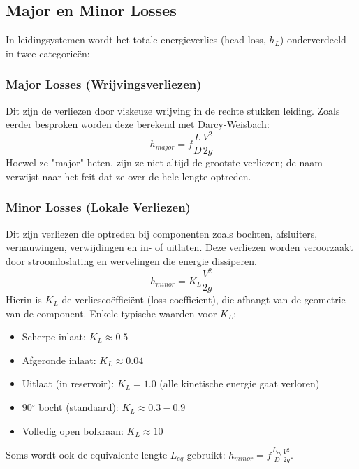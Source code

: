 \documentclass[a4paper,11pt,twoside]{report}
\begin{document}
\subsection{Major en Minor Losses}
In leidingsystemen wordt het totale energieverlies (head loss, $h_L$) onderverdeeld in twee categorieën:

\subsubsection{Major Losses (Wrijvingsverliezen)}
Dit zijn de verliezen door viskeuze wrijving in de rechte stukken leiding. Zoals eerder besproken worden deze berekend met Darcy-Weisbach:
\[ h_{major} = f \frac{L}{D} \frac{V^2}{2g} \]
Hoewel ze "major" heten, zijn ze niet altijd de grootste verliezen; de naam verwijst naar het feit dat ze over de hele lengte optreden.

\subsubsection{Minor Losses (Lokale Verliezen)}
Dit zijn verliezen die optreden bij componenten zoals bochten, afsluiters, vernauwingen, verwijdingen en in- of uitlaten. Deze verliezen worden veroorzaakt door stroomloslating en wervelingen die energie dissiperen.
\[ h_{minor} = K_L \frac{V^2}{2g} \]
Hierin is $K_L$ de verliescoëfficiënt (loss coefficient), die afhangt van de geometrie van de component.
Enkele typische waarden voor $K_L$:
\begin{itemize}
    \item Scherpe inlaat: $K_L \approx 0.5$
    \item Afgeronde inlaat: $K_L \approx 0.04$
    \item Uitlaat (in reservoir): $K_L = 1.0$ (alle kinetische energie gaat verloren)
    \item 90$^\circ$ bocht (standaard): $K_L \approx 0.3 - 0.9$
    \item Volledig open bolkraan: $K_L \approx 10$
\end{itemize}

Soms wordt ook de equivalente lengte $L_{eq}$ gebruikt: $h_{minor} = f \frac{L_{eq}}{D} \frac{V^2}{2g}$.
\end{document}
